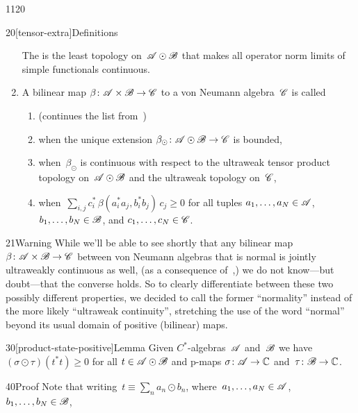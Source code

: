 \begin{parsec}{1120}
\begin{point}{20}[tensor-extra]{Definitions}
\begin{enumerate}
The %
is the least topology on~$\scrA\odot\scrB$
that makes all operator norm limits
of simple functionals continuous.
\item
A bilinear map $\beta\colon \mathscr{A}\times \mathscr{B}\to\mathscr{C}$
to a von Neumann algebra~$\mathscr{C}$
is called
\begin{enumerate}
\item
(continues the list from~)
\item
{}%
when the unique extension $\beta_\odot \colon \mathscr{A}\odot \mathscr{B}\to \mathscr{C}$
is bounded,
\item 
{}%
%
when~$\beta_\odot$
is continuous with respect to the ultraweak tensor product topology 
on~$\scrA\odot\scrB$
and the ultraweak topology on~$\mathscr{C}$,
\item
{}%
%
%
when~$\sum_{i,j}c_i^*\,\beta(a_i^*a_j,b_i^*b_j)\,c_j\geq 0$
for all tuples $a_1,\dotsc,a_N\in\mathscr{A}$,
$b_1,\dotsc,b_N\in\mathscr{B}$,
and $c_1,\dotsc,c_N\in\mathscr{C}$.
\end{enumerate}
\end{enumerate}
\spacingfix%
\begin{point}{21}{Warning}%
While we'll be able to see shortly that any bilinear map
$\beta\colon \mathscr{A}\times\mathscr{B}\to\mathscr{C}$
between von Neumann algebras
that is normal
is jointly ultraweakly continuous as well,
(as a consequence of~,)
we do not know---but doubt---that the converse holds.
So to clearly differentiate between these two possibly different properties,
we decided to call the former ``normality'' instead of 
    the more likely ``ultraweak continuity'',
stretching the use of the word ``normal'' beyond its usual 
    domain of positive (bilinear) maps.
\end{point}
\end{point}
\begin{point}{30}[product-state-positive]{Lemma}%
Given $C^*$-algebras~$\mathscr{A}$ and~$\mathscr{B}$
we have~$(\sigma\odot \tau) (t^*t)\geq 0$
for all  $t\in\mathscr{A}\odot\mathscr{B}$
and p-maps  $\sigma\colon \mathscr{A}\to\mathbb{C}$
and~$\tau\colon \mathscr{B}\to\mathbb{C}$.
\begin{point}{40}{Proof}%
Note that writing~$t\equiv \sum_n a_n \odot b_n$,
where~$a_1,\dotsc,a_N\in \mathscr{A}$, $b_1,\dotsc,b_N\in \mathscr{B}$,

\end{point}
\end{point}
\end{parsec}
